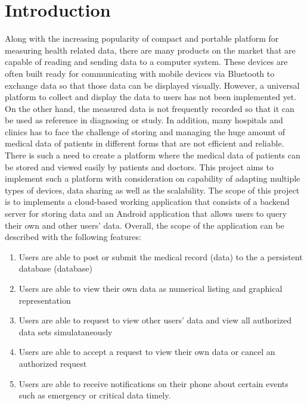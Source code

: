 \section{Introduction}
Along with the increasing popularity of compact and portable platform for measuring health related data, there are many
products on the market that are capable of reading and sending data to a computer system. These devices are often built
ready for communicating with mobile devices via Bluetooth to exchange data so that those data can be displayed visually.
However, a universal platform to collect and display the data to users has not been implemented yet. On the other hand,
the measured data is not frequently recorded so that it can be used as reference in diagnosing or study. In addition,
many hospitals and clinics has to face the challenge of storing and managing the huge amount of medical data of patients
in different forms that are not efficient and reliable. There is such a need to create a platform where the medical data
of patients can be stored and viewed easily by patients and doctors. This project aims to implement such a platform with
consideration on capability of adapting multiple types of devices, data sharing as well as the scalability.  The scope
of this project is to implements a cloud-based working application that consists of a backend server for storing data
and an Android application that allows users to query their own and other users' data. Overall, the scope of the
application can be described with the following features:
\begin{enumerate}
    \item Users are able to post or submit the medical record (data) to the a persistent database (database)
    \item Users are able to view their own data as numerical listing and graphical representation
    \item Users are able to request to view other users' data and view all authorized data sets simulataneously
    \item Users are able to accept a request to view their own data or cancel an authorized request
    \item Users are able to receive notifications on their phone about certain events such as emergency or critical
        data timely.
\end{enumerate}

